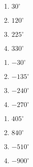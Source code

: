 \documentclass{ximera}
\begin{document}
\begin{multicols}{4} 

\begin{enumerate}

\setcounter{enumi}{\value{HW}}

\item  $30^{\circ}$  \label{orientedanglefirst}

\item  $120^{\circ}$

\item  $225^{\circ}$

\item $330^{\circ}$ 


\setcounter{HW}{\value{enumi}}

\end{enumerate}

\end{multicols}

\begin{multicols}{4} 

\begin{enumerate}

\setcounter{enumi}{\value{HW}}

\item  $-30^{\circ}$

\item $-135^{\circ}$ 

\item $-240^{\circ}$

\item $-270^{\circ}$

\setcounter{HW}{\value{enumi}}

\end{enumerate}

\end{multicols}


\begin{multicols}{4} 

\begin{enumerate}

\setcounter{enumi}{\value{HW}}

\item $405^{\circ}$  

\item $840^{\circ}$ 

\item $-510^{\circ}$

\item $-900^{\circ}$

\label{orientedanglelast}

\setcounter{HW}{\value{enumi}}

\end{enumerate}

\end{multicols}
\end{document}
